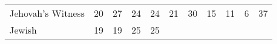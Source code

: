 \documentclass[]{article}
\begin{document}
\begin{longtable}[]{@{}lllllllllll@{}}
\begin{minipage}[t]{0.14\columnwidth}\raggedright
Jehovah's Witness\strut
\end{minipage} & \begin{minipage}[t]{0.04\columnwidth}\raggedright
20\strut
\end{minipage} & \begin{minipage}[t]{0.05\columnwidth}\raggedright
27\strut
\end{minipage} & \begin{minipage}[t]{0.05\columnwidth}\raggedright
24\strut
\end{minipage} & \begin{minipage}[t]{0.05\columnwidth}\raggedright
24\strut
\end{minipage} & \begin{minipage}[t]{0.05\columnwidth}\raggedright
21\strut
\end{minipage} & \begin{minipage}[t]{0.05\columnwidth}\raggedright
30\strut
\end{minipage} & \begin{minipage}[t]{0.06\columnwidth}\raggedright
15\strut
\end{minipage} & \begin{minipage}[t]{0.06\columnwidth}\raggedright
11\strut
\end{minipage} & \begin{minipage}[t]{0.04\columnwidth}\raggedright
6\strut
\end{minipage} & \begin{minipage}[t]{0.11\columnwidth}\raggedright
37\strut
\end{minipage}\tabularnewline
\begin{minipage}[t]{0.14\columnwidth}\raggedright
Jewish\strut
\end{minipage} & \begin{minipage}[t]{0.04\columnwidth}\raggedright
19\strut
\end{minipage} & \begin{minipage}[t]{0.05\columnwidth}\raggedright
19\strut
\end{minipage} & \begin{minipage}[t]{0.05\columnwidth}\raggedright
25\strut
\end{minipage} & \begin{minipage}[t]{0.05\columnwidth}\raggedright
25\strut
\end{minipage} & \begin{minipage}[t]{0.05\columnwidth}\raggedright

\end{minipage}
\end{longtable}
\end{document}
